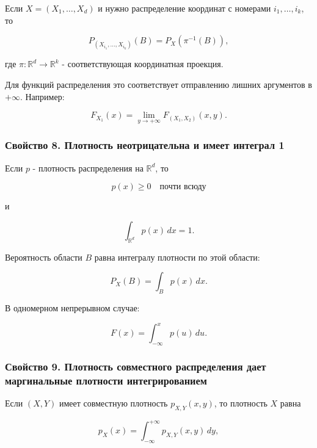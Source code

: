 \documentclass[
  11pt,
  a4paper,
]{article}
\begin{document}
Если \(X=(X_1,\ldots,X_d)\) и нужно распределение координат с номерами
\(i_1,\ldots,i_k\), то

\[
P_{(X_{i_1},\ldots,X_{i_k})}(B)
=
P_X(\pi^{-1}(B)),
\]

где \(\pi:\mathbb R^d\to\mathbb R^k\) - соответствующая координатная
проекция.

Для функций распределения это соответствует отправлению лишних
аргументов в \(+\infty\). Например:

\[
F_{X_1}(x)=\lim_{y\to+\infty}F_{(X_1,X_2)}(x,y).
\]

\subsubsection{Свойство 8. Плотность неотрицательна и имеет интеграл
1}\label{ux441ux432ux43eux439ux441ux442ux432ux43e-8.-ux43fux43bux43eux442ux43dux43eux441ux442ux44c-ux43dux435ux43eux442ux440ux438ux446ux430ux442ux435ux43bux44cux43dux430-ux438-ux438ux43cux435ux435ux442-ux438ux43dux442ux435ux433ux440ux430ux43b-1}

Если \(p\) - плотность распределения на \(\mathbb R^d\), то

\[
p(x)\ge0\quad\text{почти всюду}
\]

и

\[
\int_{\mathbb R^d}p(x)\,dx=1.
\]

Вероятность области \(B\) равна интегралу плотности по этой области:

\[
P_X(B)=\int_Bp(x)\,dx.
\]

В одномерном непрерывном случае:

\[
F(x)=\int_{-\infty}^{x}p(u)\,du.
\]

\subsubsection{Свойство 9. Плотность совместного распределения дает
маргинальные плотности
интегрированием}\label{ux441ux432ux43eux439ux441ux442ux432ux43e-9.-ux43fux43bux43eux442ux43dux43eux441ux442ux44c-ux441ux43eux432ux43cux435ux441ux442ux43dux43eux433ux43e-ux440ux430ux441ux43fux440ux435ux434ux435ux43bux435ux43dux438ux44f-ux434ux430ux435ux442-ux43cux430ux440ux433ux438ux43dux430ux43bux44cux43dux44bux435-ux43fux43bux43eux442ux43dux43eux441ux442ux438-ux438ux43dux442ux435ux433ux440ux438ux440ux43eux432ux430ux43dux438ux435ux43c}

Если \((X,Y)\) имеет совместную плотность \(p_{X,Y}(x,y)\), то плотность
\(X\) равна

\[
p_X(x)=\int_{-\infty}^{+\infty}p_{X,Y}(x,y)\,dy,
\]
\end{document}
